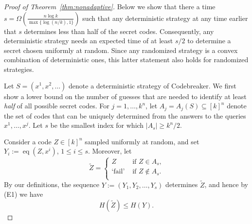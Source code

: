 \documentclass[english,a4paper,11pt]{article}
\DeclareMathOperator{\eq}{eq}
\begin{document}
{\begin{proof}[Proof of Theorem~\ref{thm:nonadaptive}] 
Below we show that there a time $s = \Omega \left( \frac{n \log k}{\max\{\log(n/k), 1\}} \right)$ such that
any deterministic strategy at any time earlier that $s$ determines less than half of the secret codes. Consequently, any deterministic strategy needs an expected time of at least $s/2$ to determine a secret chosen uniformly at random. Since any randomized strategy is a convex combination of deterministic ones, this latter statement also holds for randomized strategies.
 
Let $S = (x^1, x^2, \dots)$ denote a deterministic strategy of Codebreaker. 
We first show a lower bound on the number of guesses that are needed to identify at least \emph{half} of all possible secret codes. For $j=1, \ldots, k^n$, let $A_j=A_j(S)\subseteq [k]^n$ denote the set of codes that can be uniquely determined from the answers to the queries $x^1, \ldots, x^j$. Let $s$ be the smallest index for which $|A_s|\geq k^n/2$.


Consider a code $Z \in [k]^n$ sampled uniformly at random, and set $Y_i := \eq(Z, x^i)$, $1 \le i \le s$.
Moreover, let
\[
\tilde Z =
\begin{cases}
Z & \text{ if $Z \in A_s$,} \\
\text{`fail'} & \text{ if $Z \notin A_s$.} \\
\end{cases}
\]
By our definitions, the sequence $Y:=(Y_1, Y_2, \dots, Y_s)$ determines $\tilde Z$, and hence by (E1) we have
\begin{equation} \label{eq:entropy-tilde-Z-Y}
H(\tilde Z) \le H(Y) .
\end{equation}


\end{proof}}
\end{document}
